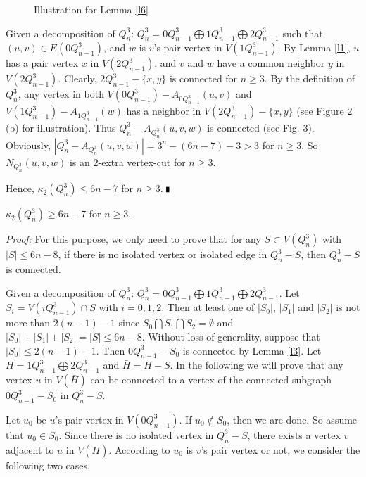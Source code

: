 \documentclass[preprint,number,12pt]{elsarticle}
\begin{document}
\begin{figure}\centering
{}
\caption{Illustration for Lemma \ref{l6}}
\end{figure}


Given a decomposition of $Q_n^3$: $Q_n^3=0Q_{n-1}^{3}\bigoplus 1Q_{n-1}^{3}\bigoplus 2Q_{n-1}^{3}$ such that
$(u, v)\in E(0Q_{n-1}^{3})$, and $w$ is $v$'s pair vertex in $V(1Q_{n-1}^{3})$.
By Lemma \ref{l1}, $u$ has a pair vertex $x$ in $V(2Q_{n-1}^{3})$,
and $v$ and $w$ have a common neighbor $y$ in $V(2Q_{n-1}^{3})$.
Clearly, $2Q_{n-1}^3- \{x,y\}$ is connected for $n\ge 3$. By the definition of $Q_n^3$,
any vertex in both $V(0Q_{n-1}^3)- A_{0Q_{n-1}^3}(u,v)$ and $V(1Q_{n-1}^3)- A_{1Q_{n-1}^3}(w)$
has a neighbor in $V(2Q_{n-1}^3)- \{x,y\}$ (see Figure 2 (b) for illustration). Thus $Q_{n}^{3}-A_{Q_{n}^{3}}(u, v, w)$ is connected (see Fig. 3).
Obviously, $|Q_{n}^{3}-A_{Q_{n}^{3}}(u,v,w)|=3^n-(6n-7)-3>3$ for $n\ge 3$.
So $N_{Q_{n}^{3}}(u,v,w)$ is an 2-extra vertex-cut for $n \geq 3$.

Hence, $\kappa_2(Q_{n}^{3})\le 6n-7$ for $n \geq 3$.
$\hfill\rule{1mm}{2mm}$

\begin{thm}\label{t2}
$\kappa_2(Q_{n}^{3})\ge 6n-7$ for $n \geq 3$.
\end{thm}
\emph{Proof:}
For this purpose, we only need to prove that for any $S\subset V(Q_{n}^{3})$ with $|S| \leq 6n-8$, if
there is no isolated vertex or isolated edge in $Q_{n}^{3}-S$, then $Q_{n}^{3}-S$ is connected.

Given a decomposition of $Q_n^3$: $Q_n^3=0Q_{n-1}^{3}\bigoplus 1Q_{n-1}^{3}\bigoplus 2Q_{n-1}^{3}$.
Let $S_{i} = V(iQ_{n-1}^{3}) \cap S$ with $i = 0, 1, 2$.
Then at least one of $|S_{0}|$, $|S_{1}|$ and $|S_{2}|$ is not more than $2(n-1)-1$ since $S_{0}\bigcap S_1\bigcap S_{2} = {\emptyset}$ and $|S_{0}|+|S_{1}|+|S_{2}| = |S| \leq 6n-8$. Without loss of generality, suppose that $|S_{0}| \leq 2(n-1)-1$. Then $0Q_{n-1}^{3}-S_{0}$ is connected by Lemma \ref{l3}.
Let $H=1Q_{n-1}^{3}\bigoplus 2Q_{n-1}^{3}$ and $\bar{H}=H-S$.
In the following we will prove that any vertex $u$ in $V(\bar{H})$ can be connected to a vertex of the connected subgraph $0Q_{n-1}^{3}-S_{0}$ in $Q_{n}^{3}-S$.

Let $u_{0}$ be $u$'s pair vertex in $V(0Q_{n-1}^{3})$. If $u_{0} \not\in S_{0}$, then we are done. So assume that $u_{0} \in S_{0}$. Since there is no isolated vertex in $Q_{n}^{3}-S$, there exists a vertex $v$ adjacent to $u$ in $V(\bar{H})$. According to $u_{0}$ is $v$'s pair vertex or not, we consider the following two cases.
\end{document}
